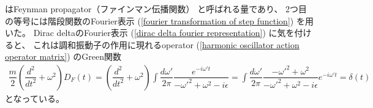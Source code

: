 はFeynman propagator（ファインマン伝播関数）
と呼ばれる量であり、
2つ目の等号には階段関数のFourier表示
(\ref{fourier transformation of step function})
を用いた。
Dirac deltaのFourier表示
(\ref{dirac delta fourier representation})
に気を付けると、
これは調和振動子の作用に現れるoperator
(\ref{harmonic oscillator action operator matrix})
のGreen関数
\begin{align}
    \dfrac{m}{2}
    \left(
        \dfrac{d^2}{dt^2}
        +
        \omega^2
    \right)
    D_F (t)
=
    \left(
        \dfrac{d^2}{dt^2}
        +
        \omega^2
    \right)
    \int
        \dfrac{d \omega'}{2 \pi}
        \dfrac{
            e^{ - i \omega' t }
        }{- \omega'^2 + \omega^2 - i \epsilon}
=
    \int
        \dfrac{d \omega'}{2 \pi}
        \dfrac{
        -
            \omega'^2
        +
            \omega^2
        }{- \omega'^2 + \omega^2 - i \epsilon}
        e^{ - i \omega' t }
= 
    \delta (t)
\end{align}
となっている。

